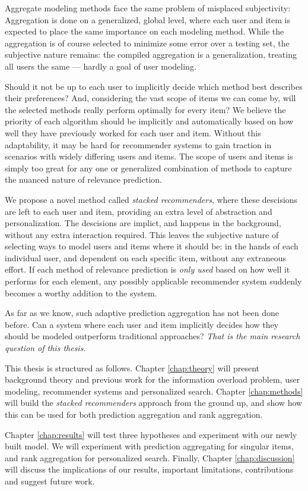 Aggregate modeling methods face the same problem of misplaced subjectivity: 
Aggregation is done on a generalized, global level,
where each user and item is expected to place the same importance on each modeling method.
While the aggregation is of course selected to minimize some error over a testing set,
the subjective nature remains: the compiled aggregation is a generalization,
treating all users the same --- hardly a goal of user modeling.

Should it not be up to each user to implicitly decide which method best describes their preferences?
And, considering the vast scope of items we can come by, will the selected
methods really perform optimally for every item?
We believe the priority of each algorithm should be implicitly and automatically
based on how well they have previously worked for each user and item.
Without this adaptability, it may be hard for recommender systems
to gain traction in scenarios with widely differing users and items.
The scope of users and items is simply too great for any one or generalized combination
of methods to capture the nuanced nature of relevance prediction.

We propose a novel method called \emph{stacked recommenders}, where these descisions are left to each user and item,
providing an extra level of abstraction and personalization.
The descisions are implict, and happens in the background, without any extra interaction required.
This leaves the subjective nature of selecting ways to model users and items where it should be:
in the hands of each individual user, and dependent on each specific item, without any extraneous effort.
If each method of relevance prediction is \emph{only used} based on how well it performs for each element,
any possibly applicable recommender system suddenly becomes a worthy addition to the system.

As far as we know, such adaptive prediction aggregation has not been done before.
Can a system where each user and item implicitly decides how they should be modeled outperform traditional approaches?
\emph{That is the main research question of this thesis}.

\hr

\noindent
This thesis is structured as follows.
Chapter \ref{chap:theory} will present background theory and previous work for
the information overload problem, user modeling, recommender systems and personalized search. 
Chapter \ref{chap:methods} will build the \emph{stacked recommenders} approach from the ground up,
and show how this can be used for both prediction aggregation and rank aggregation.

Chapter \ref{chap:results} will test three hypotheses and experiment with our newly built model.
We will experiment with prediction aggregating for singular items, and rank aggregation for personalized search.
Finally, Chapter \ref{chap:discussion} will discuss the implications of our results,
important limitations, contributions and suggest future work.


